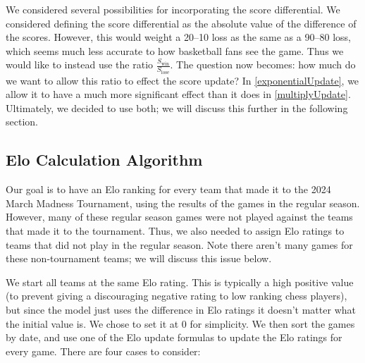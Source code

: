 \documentclass{article}
\begin{document}
We considered several possibilities for incorporating the score differential. We considered defining the score differential as the absolute value of the difference of the scores. However, this would weight a 20--10 loss as the same as a 90--80 loss, which seems much less accurate to how basketball fans see the game. Thus we would like to instead use the ratio $\frac{S_{\text{win}}}{S_{\text{lose}}}$. The question now becomes: how much do we want to allow this ratio to effect the score update? In \autoref{exponentialUpdate}, we allow it to have a much more significant effect than it does in \autoref{multiplyUpdate}. Ultimately, we decided to use both; we will discuss this further in the following section.

\subsection{Elo Calculation Algorithm}
Our goal is to have an Elo ranking for every team that made it to the 2024 March Madness Tournament, using the results of the games in the regular season. However, many of these regular season games were not played against the teams that made it to the tournament. Thus, we also needed to assign Elo ratings to teams that did not play in the regular season. Note there aren't many games for these non-tournament teams; we will discuss this issue below. 

We start all teams at the same Elo rating. This is typically a high positive value (to prevent giving a discouraging negative rating to low ranking chess players), but since the model just uses the difference in Elo ratings it doesn't matter what the initial value is. We chose to set it at 0 for simplicity. We then sort the games by date, and use one of the Elo update formulas to update the Elo ratings for every game. There are four cases to consider:
\end{document}
